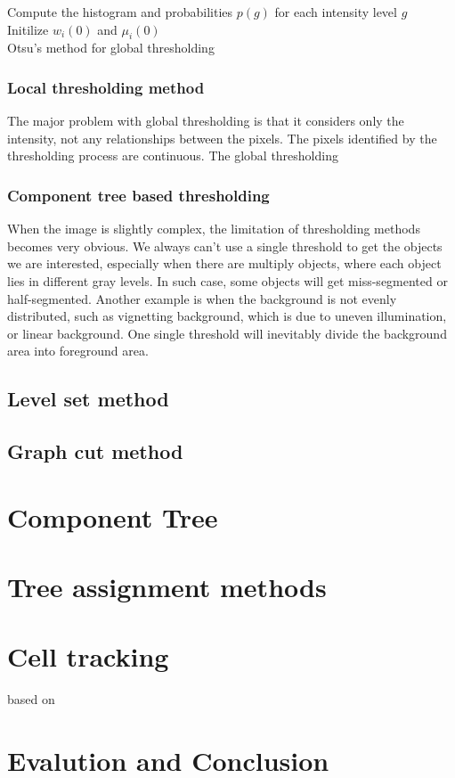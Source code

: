 \documentclass[b5,12pt]{report}
\begin{document}
\begin{algorithm}
\SetAlgoLined
{}
Compute the histogram and probabilities $p(g)$ for each intensity level $g$\\
Initilize $w_i(0)$ and $\mu_i(0)$\\
\caption{Otsu's method for global thresholding}
\label{alg:otsu-thresh}
\end{algorithm}

\subsection{Local thresholding method}
The major problem with global thresholding is that it considers only the intensity, not any relationships between the pixels. The pixels identified by the thresholding process are continuous. The global thresholding 
\subsection{Component tree based thresholding}
When the image is slightly complex, the limitation of thresholding methods becomes very obvious. We always can't use a single threshold to get the objects we are interested, especially when there are multiply objects, where each object lies in different gray levels. In such case, some objects will get miss-segmented or half-segmented. Another example is when the background is not evenly distributed, such as vignetting background, which is due to uneven illumination, or linear background. One single threshold will inevitably divide the background area into foreground area.
\section{Level set method}
\section{Graph cut method}
\chapter{Component Tree}
\chapter{Tree assignment methods}
\chapter{Cell tracking}
based on \cite{Xiao:2011}
\chapter{Evalution and Conclusion}


\end{document}

